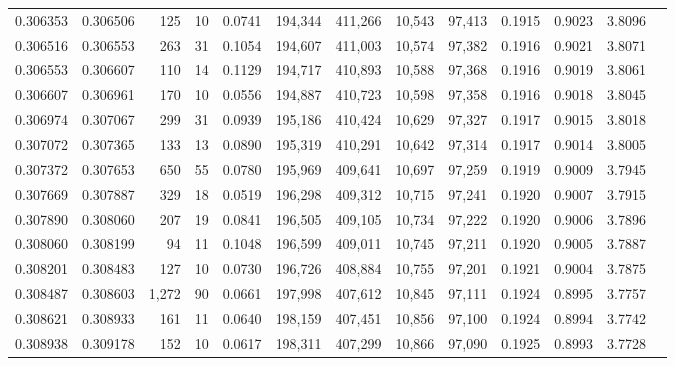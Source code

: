 \begin{tabular}{rrrrrrrrrrrrr}
0.306353 & 0.306506 &   125 &  10 &                                     0.0741 & 194,344 & 411,266 &  10,543 &  97,413 & 0.1915 & 0.9023 & 3.8096 \\
0.306516 & 0.306553 &   263 &  31 &                                     0.1054 & 194,607 & 411,003 &  10,574 &  97,382 & 0.1916 & 0.9021 & 3.8071 \\
0.306553 & 0.306607 &   110 &  14 &                                     0.1129 & 194,717 & 410,893 &  10,588 &  97,368 & 0.1916 & 0.9019 & 3.8061 \\
0.306607 & 0.306961 &   170 &  10 &                                     0.0556 & 194,887 & 410,723 &  10,598 &  97,358 & 0.1916 & 0.9018 & 3.8045 \\
0.306974 & 0.307067 &   299 &  31 &                                     0.0939 & 195,186 & 410,424 &  10,629 &  97,327 & 0.1917 & 0.9015 & 3.8018 \\
0.307072 & 0.307365 &   133 &  13 &                                     0.0890 & 195,319 & 410,291 &  10,642 &  97,314 & 0.1917 & 0.9014 & 3.8005 \\
0.307372 & 0.307653 &   650 &  55 &                                     0.0780 & 195,969 & 409,641 &  10,697 &  97,259 & 0.1919 & 0.9009 & 3.7945 \\
0.307669 & 0.307887 &   329 &  18 &                                     0.0519 & 196,298 & 409,312 &  10,715 &  97,241 & 0.1920 & 0.9007 & 3.7915 \\
0.307890 & 0.308060 &   207 &  19 &                                     0.0841 & 196,505 & 409,105 &  10,734 &  97,222 & 0.1920 & 0.9006 & 3.7896 \\
0.308060 & 0.308199 &    94 &  11 &                                     0.1048 & 196,599 & 409,011 &  10,745 &  97,211 & 0.1920 & 0.9005 & 3.7887 \\
0.308201 & 0.308483 &   127 &  10 &                                     0.0730 & 196,726 & 408,884 &  10,755 &  97,201 & 0.1921 & 0.9004 & 3.7875 \\
0.308487 & 0.308603 & 1,272 &  90 &                                     0.0661 & 197,998 & 407,612 &  10,845 &  97,111 & 0.1924 & 0.8995 & 3.7757 \\
0.308621 & 0.308933 &   161 &  11 &                                     0.0640 & 198,159 & 407,451 &  10,856 &  97,100 & 0.1924 & 0.8994 & 3.7742 \\
0.308938 & 0.309178 &   152 &  10 &                                     0.0617 & 198,311 & 407,299 &  10,866 &  97,090 & 0.1925 & 0.8993 & 3.7728 \\

\end{tabular}
